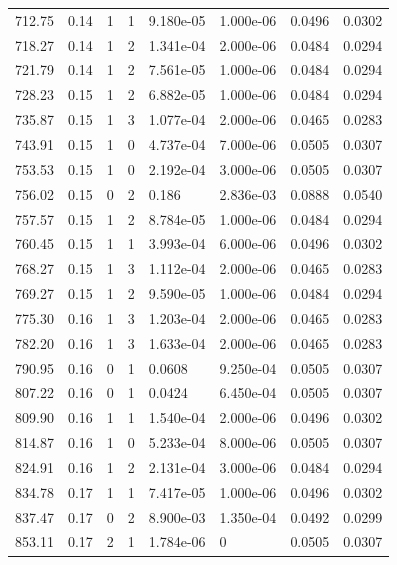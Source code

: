 \documentclass[preview]{standalone}
\begin{document}
{{{\begin{tabular}{L{1.2cm}C{1.2cm} C{0.3cm}C{0.5cm} C{1.4cm}C{1.4cm} C{1.4cm}C{1.4cm}}
  712.75  &  0.14  & 1     &  1 &  9.180e-05  & 1.000e-06  & 0.0496 &  0.0302   \\ 
  718.27  &  0.14  & 1     &  2 &  1.341e-04  & 2.000e-06  & 0.0484 &  0.0294   \\ 
  721.79  &  0.14  & 1     &  2 &  7.561e-05  & 1.000e-06  & 0.0484 &  0.0294   \\ 
  728.23  &  0.15  & 1     &  2 &  6.882e-05  & 1.000e-06  & 0.0484 &  0.0294   \\ 
  735.87  &  0.15  & 1     &  3 &  1.077e-04  & 2.000e-06  & 0.0465 &  0.0283   \\ 
  743.91  &  0.15  & 1     &  0 &  4.737e-04  & 7.000e-06  & 0.0505 &  0.0307   \\ 
  753.53  &  0.15  & 1     &  0 &  2.192e-04  & 3.000e-06  & 0.0505 &  0.0307   \\ 
  756.02  &  0.15  & 0     &  2 &  0.186  & 2.836e-03  & 0.0888 &  0.0540   \\ 
  757.57  &  0.15  & 1     &  2 &  8.784e-05  & 1.000e-06  & 0.0484 &  0.0294   \\ 
  760.45  &  0.15  & 1     &  1 &  3.993e-04  & 6.000e-06  & 0.0496 &  0.0302   \\ 
  768.27  &  0.15  & 1     &  3 &  1.112e-04  & 2.000e-06  & 0.0465 &  0.0283   \\ 
  769.27  &  0.15  & 1     &  2 &  9.590e-05  & 1.000e-06  & 0.0484 &  0.0294   \\ 
  775.30  &  0.16  & 1     &  3 &  1.203e-04  & 2.000e-06  & 0.0465 &  0.0283   \\ 
  782.20  &  0.16  & 1     &  3 &  1.633e-04  & 2.000e-06  & 0.0465 &  0.0283   \\ 
  790.95  &  0.16  & 0     &  1 &  0.0608  & 9.250e-04  & 0.0505 &  0.0307   \\ 
  807.22  &  0.16  & 0     &  1 &  0.0424  & 6.450e-04  & 0.0505 &  0.0307   \\ 
  809.90  &  0.16  & 1     &  1 &  1.540e-04  & 2.000e-06  & 0.0496 &  0.0302   \\ 
  814.87  &  0.16  & 1     &  0 &  5.233e-04  & 8.000e-06  & 0.0505 &  0.0307   \\ 
  824.91  &  0.16  & 1     &  2 &  2.131e-04  & 3.000e-06  & 0.0484 &  0.0294   \\ 
  834.78  &  0.17  & 1     &  1 &  7.417e-05  & 1.000e-06  & 0.0496 &  0.0302   \\ 
  837.47  &  0.17  & 0     &  2 &  8.900e-03  & 1.350e-04  & 0.0492 &  0.0299   \\ 
  853.11  &  0.17  & 2     &  1 &  1.784e-06  & 0  & 0.0505 &  0.0307   \\ 

\end{tabular}}}}
\end{document}
